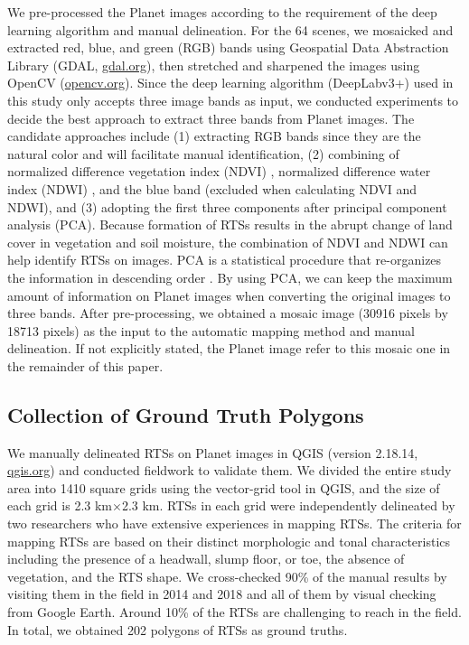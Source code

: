 \documentclass[preprint,12pt,authoryear]{elsarticle}
\begin{document}
We pre-processed the Planet images according to the requirement of the deep learning algorithm and manual delineation. For the 64 scenes, we mosaicked and extracted red, blue, and green (RGB) bands using Geospatial Data Abstraction Library (GDAL, \url{gdal.org}), then stretched and sharpened the images using OpenCV (\url{opencv.org}). Since the deep learning algorithm (DeepLabv3+) used in this study only accepts three image bands as input, we conducted experiments to decide the best approach to extract three bands from Planet images. The candidate approaches include (1) extracting RGB bands since they are the natural color and will facilitate manual identification, (2) combining of normalized difference vegetation index (NDVI) \citep{rouse1974monitoring}, normalized difference water index (NDWI) \citep{mcfeeters1996use}, and the blue band (excluded when calculating NDVI and NDWI), and (3) adopting the first three components after principal component analysis (PCA). Because formation of RTSs results in the abrupt change of land cover in vegetation and soil moisture, the combination of NDVI and NDWI can help identify RTSs on images. PCA is a statistical procedure that re-organizes the information in descending order \citep{wold1987principal}. By using PCA, we can keep the maximum amount of information on Planet images when converting the original images to three bands. 
 After pre-processing, we obtained a mosaic image (30916 pixels by 18713 pixels) as the input to the automatic mapping method and manual delineation. If not explicitly stated, the Planet image refer to this mosaic one in the remainder of this paper.

\subsection{Collection of Ground Truth Polygons}
\label{subsec_collect_groundtruth}

We manually delineated RTSs on Planet images in QGIS (version 2.18.14, \url{qgis.org}) and conducted fieldwork to validate them. We divided the entire study area into 1410 square grids using the vector-grid tool in QGIS, and the size of each grid is 2.3 km$\times$2.3 km. RTSs in each grid were independently delineated by two researchers who have extensive experiences in mapping RTSs. 
The criteria for mapping RTSs are based on their distinct morphologic and tonal characteristics including the presence of a headwall, slump floor, or toe, the absence of vegetation, and the RTS shape. We cross-checked 90\% of the manual results by visiting them in the field in 2014 and 2018 and all of them by visual checking from Google Earth. Around 10\% of the RTSs are challenging to reach in the field. In total, we obtained 202 polygons of RTSs as ground truths.  
\end{document}
